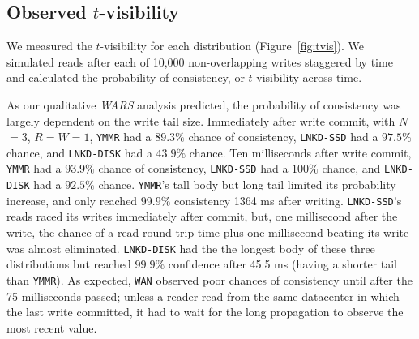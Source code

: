 \documentclass{vldb}
\begin{document}
\subsection{Observed $t$-visibility}

We measured the $t$-visibility for each distribution
(Figure~\ref{fig:tvis}).  We simulated reads
after each of 10,000 non-overlapping writes staggered by time
and calculated the probability of consistency, or 
$t$-visibility across time.

As our qualitative \textit{WARS} analysis predicted, the probability
of consistency was largely dependent on the write tail size.
Immediately after write commit, with $N$$=$$3$, $R$$=$$W$$=$$1$,
\texttt{YMMR} had a $89.3\%$ chance of consistency, \texttt{LNKD-SSD}
had a $97.5\%$ chance, and \texttt{LNKD-DISK} had a $43.9\%$ chance.
Ten milliseconds after write commit, \texttt{YMMR} had a $93.9\%$
chance of consistency, \texttt{LNKD-SSD} had a $100\%$ chance, and
\texttt{LNKD-DISK} had a $92.5\%$ chance.  \texttt{YMMR}'s tall body
but long tail limited its probability increase, and only reached
$99.9\%$ consistency 1364 ms after writing.  \texttt{LNKD-SSD}'s reads
raced its writes immediately after commit, but, one millisecond after
the write, the chance of a read round-trip time plus one millisecond
beating its write was almost eliminated.  \texttt{LNKD-DISK} had the
the longest body of these three distributions but reached $99.9\%$
confidence after 45.5 ms (having a shorter tail than \texttt{YMMR}).  As
expected, \texttt{WAN} observed poor chances of consistency until
after the 75 milliseconds passed; unless a reader read from the same
datacenter in which the last write committed, it had to wait for the
long propagation to observe the most recent value.
\end{document}
